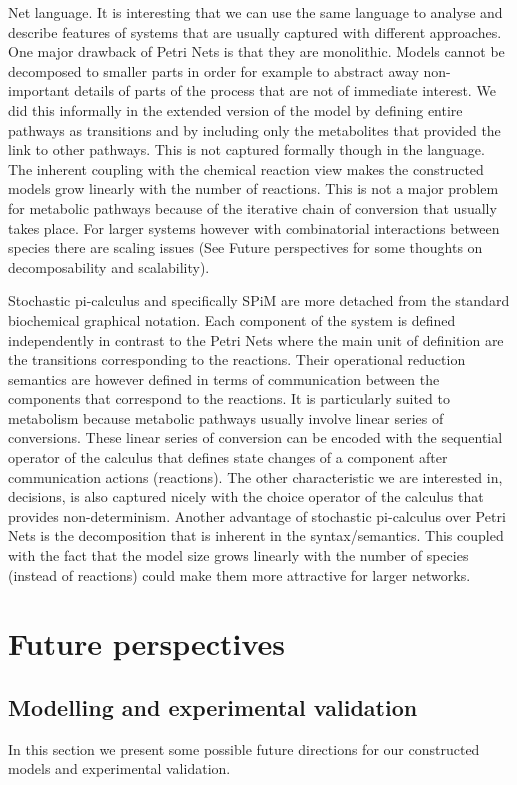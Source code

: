 Net language. It is interesting that we can use the same language to
analyse and describe features of systems that are usually captured
with different approaches. One major drawback of Petri Nets is that they
are monolithic. Models cannot be decomposed to smaller parts in order
for example to abstract away non-important details of parts of the
process that are not of immediate interest. We did this informally in
the extended version of the model by defining entire pathways as
transitions and by including only the metabolites that provided the link
to other pathways. This is not captured formally though in the
language. The inherent coupling with the chemical reaction view makes
the constructed models grow linearly with the number of
reactions. This is not a major problem for metabolic pathways because of
the iterative chain of conversion that usually takes place. For
larger systems however with combinatorial interactions between species
there are scaling issues (See Future perspectives for some thoughts on
decomposability and scalability).

Stochastic pi-calculus and specifically SPiM are more detached from
the standard biochemical graphical notation. Each component of the
system is defined independently in contrast to the Petri Nets where the
main unit of definition are the transitions corresponding to the
reactions. Their operational reduction semantics are however defined in terms
of communication between the components that correspond to the
reactions. It is particularly suited to metabolism because metabolic
pathways usually involve linear series of conversions. These linear
series of conversion can be encoded with the sequential operator of
the calculus that defines state changes of a component after
communication actions (reactions). The other characteristic we are
interested in, decisions, is also captured nicely with the choice
operator of the calculus that provides non-determinism. Another
advantage of stochastic pi-calculus over Petri Nets is the
decomposition that is inherent in the syntax/semantics. This coupled
with the fact that the model size grows linearly with the number of
species (instead of reactions) could make them more attractive for
larger networks.



\section{Future perspectives}

\subsection{Modelling and experimental validation}
In this section we present some possible future directions for our
constructed models and experimental validation.

